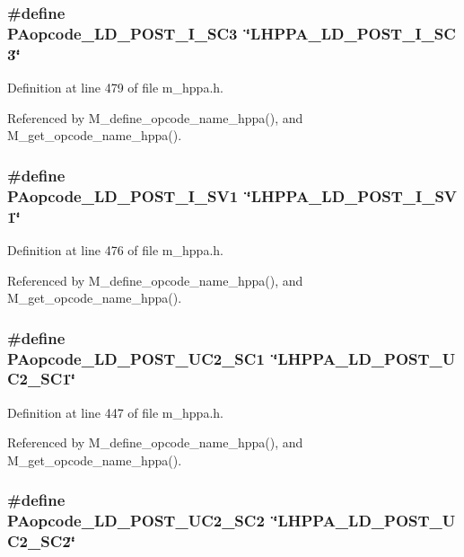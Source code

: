 \subsubsection{\setlength{\rightskip}{0pt plus 5cm}\#define PAopcode\_\-LD\_\-POST\_\-I\_\-SC3~\char`\"{}LHPPA\_\-LD\_\-POST\_\-I\_\-SC3\char`\"{}}\label{m__hppa_8h_12659b793a7163b837f6e1767bc144f1}




Definition at line 479 of file m\_\-hppa.h.

Referenced by M\_\-define\_\-opcode\_\-name\_\-hppa(), and M\_\-get\_\-opcode\_\-name\_\-hppa().
\subsubsection{\setlength{\rightskip}{0pt plus 5cm}\#define PAopcode\_\-LD\_\-POST\_\-I\_\-SV1~\char`\"{}LHPPA\_\-LD\_\-POST\_\-I\_\-SV1\char`\"{}}\label{m__hppa_8h_2e7476873b52cd84168a180851ed65d9}




Definition at line 476 of file m\_\-hppa.h.

Referenced by M\_\-define\_\-opcode\_\-name\_\-hppa(), and M\_\-get\_\-opcode\_\-name\_\-hppa().
\subsubsection{\setlength{\rightskip}{0pt plus 5cm}\#define PAopcode\_\-LD\_\-POST\_\-UC2\_\-SC1~\char`\"{}LHPPA\_\-LD\_\-POST\_\-UC2\_\-SC1\char`\"{}}\label{m__hppa_8h_43c8e0b97e0fa8dc9d323fcf78073ffc}




Definition at line 447 of file m\_\-hppa.h.

Referenced by M\_\-define\_\-opcode\_\-name\_\-hppa(), and M\_\-get\_\-opcode\_\-name\_\-hppa().
\subsubsection{\setlength{\rightskip}{0pt plus 5cm}\#define PAopcode\_\-LD\_\-POST\_\-UC2\_\-SC2~\char`\"{}LHPPA\_\-LD\_\-POST\_\-UC2\_\-SC2\char`\"{}}\label{m__hppa_8h_eb5cfc9564452ce6891eb36653b7032f}




